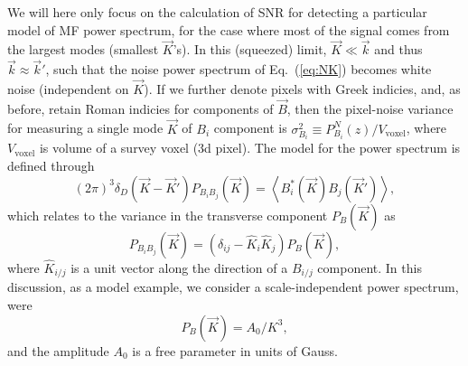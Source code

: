 \documentclass[12pt]{paper}
\newcommand{\beq}{\begin{equation}}
\newcommand{\eeq}{\end{equation}}
\begin{document}
We will here only focus on the calculation of SNR for detecting a particular model of MF power spectrum, for the case where most of the signal comes from the largest modes (smallest $\vec K$'s). In this (squeezed) limit, $\vec K \ll \vec k$ and thus $\vec k \approx \vec k'$, such that the noise power spectrum of Eq.~(\ref{eq:NK}) becomes white noise (independent on $\vec K$).  If we further denote pixels with Greek indicies, and, as before, retain Roman indicies for components of $\vec B$, then the pixel-noise variance for measuring a single mode $\vec K$ of $B_i$ component is $\sigma_{B_i}^2 \equiv P^N_{B_i}(z)/V_\text{voxel}$, where $V_\text{voxel}$ is volume of a survey voxel (3d pixel). The model for the power spectrum is defined through
\beq
(2\pi)^3\delta_D(\vec K - \vec K') P_{B_iB_j}(\vec K) = \left<B_i^*(\vec K) B_j(\vec K')\right>,
\label{eq:Pbb}
\eeq
which relates to the variance in the transverse component $P_B(\vec K)$ as
\beq
P_{B_iB_j}(\vec K) = (\delta_{ij} - \widehat K_i \widehat K_j) P_B(\vec K),
\label{eq:Pbb_Pb}
\eeq
where $\widehat K_{i/j}$ is a unit vector along the direction of a $B_{i/j}$ component.
In this discussion, as a model example, we consider a scale-independent power spectrum, were
\beq
P_{B}(\vec K) = A_0/K^3,
\label{eq:SI}
\eeq
and the amplitude $A_0$ is a free parameter in units of Gauss.
\end{document}
